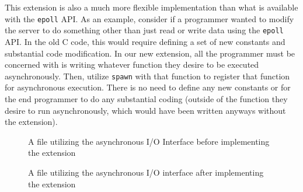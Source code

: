 \documentclass[main.tex]{subfiles}
\begin{document}
This extension is also a much more flexible implementation than what is available with the \verb|epoll| API. As an example,
consider if a programmer wanted to modify the server to do something other than just read or write data using the \verb|epoll|
API. In the old C code, this would require defining a set of new constants and substantial code modification. In our new
extension, all the programmer must be concerned with is writing whatever function they desire to be executed asynchronously.
Then, utilize \verb|spawn| with that function to register that function for asynchronous execution. There is no need to define
any new constants or for the end programmer to do any substantial coding (outside of the function they desire to run
asynchronously, which would have been written anyways without the extension).

\begin{figure}
	
	\caption{A file utilizing the asynchronous I/O Interface before implementing the extension}
\end{figure}
\begin{figure}
	
	\caption{A file utilizing the asynchronous I/O interface after implementing the extension}
\end{figure}
\end{document}
